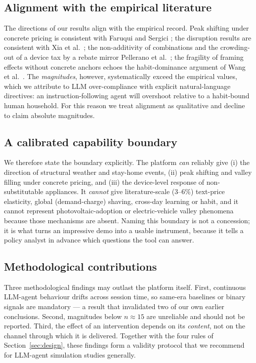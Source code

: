 \documentclass[11pt]{article}
\begin{document}
\subsection{Alignment with the empirical literature}
The directions of our results align with the empirical record. Peak shifting under concrete pricing is
consistent with Faruqui and Sergici \cite{faruqui2010}; the disruption results are consistent with Xia et
al.\ \cite{xia2026}; the non-additivity of combinations and the crowding-out of a device tax by a rebate
mirror Pellerano et al.\ \cite{pellerano2017}; the fragility of framing effects without concrete anchors
echoes the habit-dominance argument of Wang et al.\ \cite{wang2021}. The \emph{magnitudes}, however,
systematically exceed the empirical values, which we attribute to LLM over-compliance with explicit
natural-language directives: an instruction-following agent will overshoot relative to a habit-bound human
household. For this reason we treat alignment as qualitative and decline to claim absolute magnitudes.

\subsection{A calibrated capability boundary}
We therefore state the boundary explicitly. The platform \emph{can} reliably give (i) the direction of
structural weather and stay-home events, (ii) peak shifting and valley filling under concrete pricing, and
(iii) the device-level response of non-substitutable appliances. It \emph{cannot} give literature-scale
(3--6\%) text-price elasticity, global (demand-charge) shaving, cross-day learning or habit, and it cannot
represent photovoltaic-adoption or electric-vehicle valley phenomena because those mechanisms are absent.
Naming this boundary is not a concession; it is what turns an impressive demo into a usable instrument,
because it tells a policy analyst in advance which questions the tool can answer.

\subsection{Methodological contributions}
Three methodological findings may outlast the platform itself. First, continuous LLM-agent behaviour
drifts across session time, so same-era baselines or binary signals are mandatory --- a result that
invalidated two of our own earlier conclusions. Second, magnitudes below $n\approx15$ are unreliable and
should not be reported. Third, the effect of an intervention depends on its \emph{content}, not on the
channel through which it is delivered. Together with the four rules of Section~\ref{sec:design}, these
findings form a validity protocol that we recommend for LLM-agent simulation studies generally.
\end{document}

